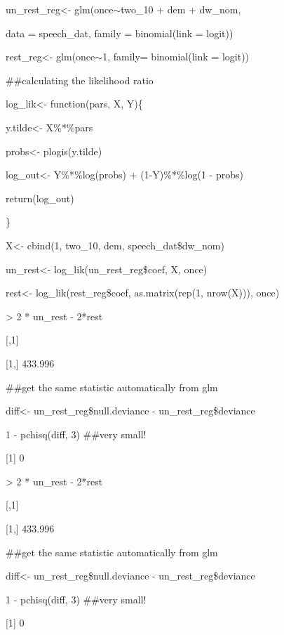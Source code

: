 \documentclass{beamer}
\begin{document}
\begin{frame}

\small
\begin{semiverbatim}

un\_rest\_reg<- glm(once$\sim$two\_10 + dem + dw\_nom,

\hspace{0.15in} data = speech\_dat, family = binomial(link = logit))


rest\_reg<- glm(once$\sim$1, family= binomial(link = logit))


\#\#calculating the likelihood ratio

log\_lik<- function(pars, X, Y)\{

  \hspace{0.15in} y.tilde<- X\%*\%pars

  \hspace{0.15in} probs<- plogis(y.tilde)

  \hspace{0.15in} log\_out<- Y\%*\%log(probs) + (1-Y)\%*\%log(1 - probs)

  \hspace{0.15in} return(log\_out)

  \}

 X<- cbind(1, two\_10, dem, speech\_dat\$dw\_nom)


 un\_rest<- log\_lik(un\_rest\_reg\$coef, X, once)


 rest<- log\_lik(rest\_reg\$coef, as.matrix(rep(1, nrow(X))), once)


 > 2 * un\_rest - 2*rest

\hspace{0.15in}        [,1]

[1,] 433.996








 \#\#get the same statistic automatically from glm

 diff<- un\_rest\_reg\$null.deviance - un\_rest\_reg\$deviance

 1 - pchisq(diff, 3) \#\#very small!

[1] 0

\end{semiverbatim}



\end{frame}

\begin{frame}

\begin{semiverbatim}
 > 2 * un\_rest - 2*rest

\hspace{0.15in}        [,1]

[1,] 433.996

 \#\#get the same statistic automatically from glm

 diff<- un\_rest\_reg\$null.deviance - un\_rest\_reg\$deviance

 1 - pchisq(diff, 3) \#\#very small!

[1] 0

\end{semiverbatim}


\end{frame}
\end{document}
